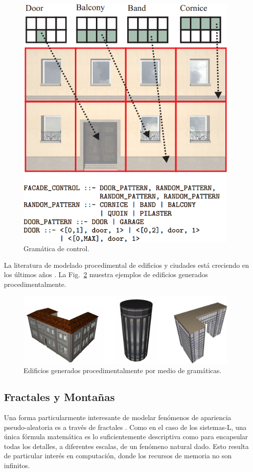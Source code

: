 \begin{figure}
\center
\includegraphics[width=11cm]{figures/controlgrammar}
\caption{Gramática de control.}
\label{fg:controlgrammar}
\end{figure}

La literatura de modelado procedimental de edificios y ciudades está creciendo en los últimos años \cite{Parish2001,Muller2006}.
La Fig.~\ref{fg:edificios} muestra ejemplos de edificios generados procedimentalmente.



\begin{figure}
\center
\includegraphics[width=11cm]{figures/edificios}
\caption{Edificios generados procedimentalmente por medio de gramáticas.}
\label{fg:edificios}
\end{figure}

\subsection{Fractales y Montañas}
Una forma particularmente interesante de modelar fenómenos de apariencia pseudo-aleatoria es a través de fractales \cite{Mandelbrot1983}.
Como en el caso de los sistemas-L, una única fórmula matemática es lo suficientemente descriptiva como para encapsular todas los detalles, a diferentes escalas, de un fenómeno natural dado.
Esto resulta de particular interés en computación, donde los recursos de memoria no son infinitos.

